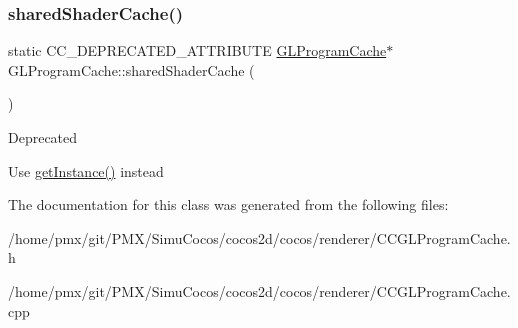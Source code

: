 \subsubsection{\texorpdfstring{shared\+Shader\+Cache()}{sharedShaderCache()}\hspace{0.1cm}{\footnotesize\ttfamily [2/2]}}
{\footnotesize\ttfamily static C\+C\+\_\+\+D\+E\+P\+R\+E\+C\+A\+T\+E\+D\+\_\+\+A\+T\+T\+R\+I\+B\+U\+TE \hyperlink{classGLProgramCache}{G\+L\+Program\+Cache}$\ast$ G\+L\+Program\+Cache\+::shared\+Shader\+Cache (\begin{DoxyParamCaption}{ }\end{DoxyParamCaption})\hspace{0.3cm}{\ttfamily [static]}}

\begin{DoxyRefDesc}{Deprecated}
\item[\hyperlink{deprecated__deprecated000363}{Deprecated}]Use \hyperlink{classGLProgramCache_a084359da301355ed6c32b12689669d37}{get\+Instance()} instead \end{DoxyRefDesc}


The documentation for this class was generated from the following files\+:\begin{DoxyCompactItemize}
\item 
/home/pmx/git/\+P\+M\+X/\+Simu\+Cocos/cocos2d/cocos/renderer/C\+C\+G\+L\+Program\+Cache.\+h\item 
/home/pmx/git/\+P\+M\+X/\+Simu\+Cocos/cocos2d/cocos/renderer/C\+C\+G\+L\+Program\+Cache.\+cpp\end{DoxyCompactItemize}
